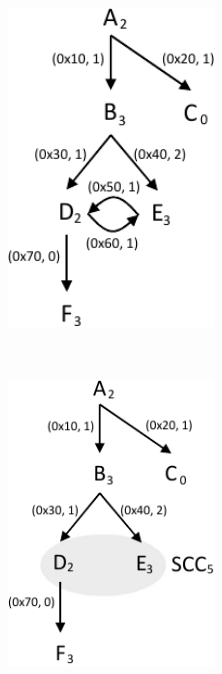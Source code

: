\begin{figure}[t]
\centering
\begin{subfigure}{0.22\textwidth}
\centering
\includegraphics[width=0.6\textwidth]{fig/cct-1.pdf}
\caption{}
\end{subfigure}
~
\begin{subfigure}{0.22\textwidth}
\centering
\includegraphics[width=0.6\textwidth]{fig/cct-2.pdf}
\caption{}
\end{subfigure}

\end{figure}

